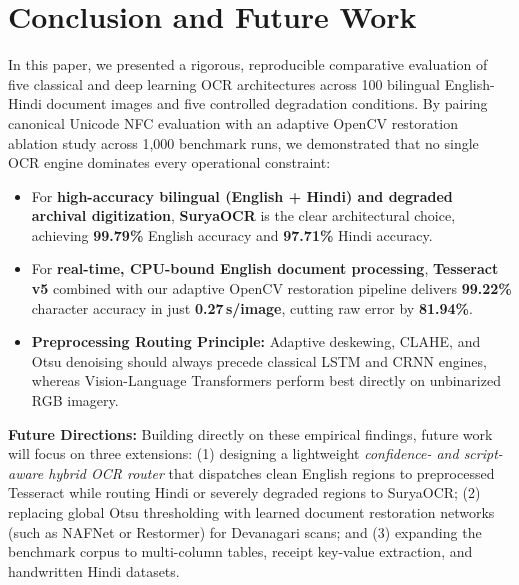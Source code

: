 \documentclass[11pt,a4paper]{article}
\begin{document}
\section{Conclusion and Future Work}
In this paper, we presented a rigorous, reproducible comparative evaluation of five classical and deep learning OCR architectures across 100 bilingual English-Hindi document images and five controlled degradation conditions. By pairing canonical Unicode NFC evaluation with an adaptive OpenCV restoration ablation study across 1,000 benchmark runs, we demonstrated that no single OCR engine dominates every operational constraint:
\begin{itemize}[leftmargin=1.4em]
    \item For \textbf{high-accuracy bilingual (English + Hindi) and degraded archival digitization}, \textbf{SuryaOCR} is the clear architectural choice, achieving \textbf{99.79\%} English accuracy and \textbf{97.71\%} Hindi accuracy.
    \item For \textbf{real-time, CPU-bound English document processing}, \textbf{Tesseract v5} combined with our adaptive OpenCV restoration pipeline delivers \textbf{99.22\%} character accuracy in just \textbf{0.27\,s/image}, cutting raw error by \textbf{81.94\%}.
    \item \textbf{Preprocessing Routing Principle:} Adaptive deskewing, CLAHE, and Otsu denoising should always precede classical LSTM and CRNN engines, whereas Vision-Language Transformers perform best directly on unbinarized RGB imagery.
\end{itemize}

\textbf{Future Directions:} Building directly on these empirical findings, future work will focus on three extensions: (1) designing a lightweight \textit{confidence- and script-aware hybrid OCR router} that dispatches clean English regions to preprocessed Tesseract while routing Hindi or severely degraded regions to SuryaOCR; (2) replacing global Otsu thresholding with learned document restoration networks (such as NAFNet or Restormer) for Devanagari scans; and (3) expanding the benchmark corpus to multi-column tables, receipt key-value extraction, and handwritten Hindi datasets.
\end{document}
